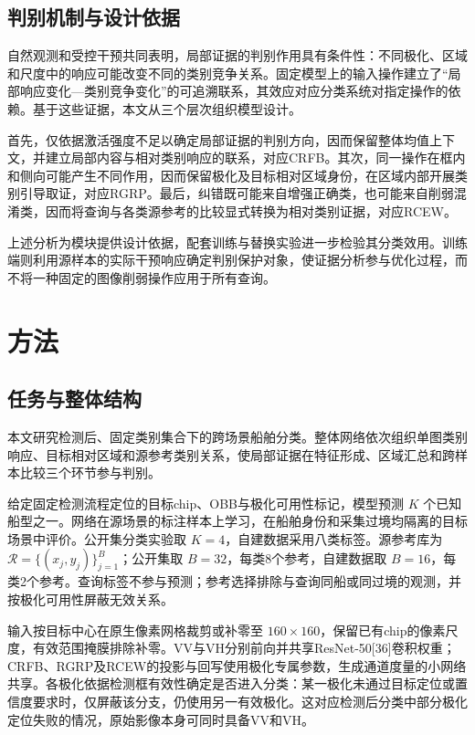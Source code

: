 \documentclass[journal,10pt,a4paper]{IEEEtran}
\begin{document}
\subsection{判别机制与设计依据}\label{ux5224ux522bux673aux5236ux4e0eux8bbeux8ba1ux4f9dux636e}

自然观测和受控干预共同表明，局部证据的判别作用具有条件性：不同极化、区域和尺度中的响应可能改变不同的类别竞争关系。固定模型上的输入操作建立了``局部响应变化---类别竞争变化''的可追溯联系，其效应对应分类系统对指定操作的依赖。基于这些证据，本文从三个层次组织模型设计。

首先，仅依据激活强度不足以确定局部证据的判别方向，因而保留整体均值上下文，并建立局部内容与相对类别响应的联系，对应CRFB。其次，同一操作在框内和侧向可能产生不同作用，因而保留极化及目标相对区域身份，在区域内部开展类别引导取证，对应RGRP。最后，纠错既可能来自增强正确类，也可能来自削弱混淆类，因而将查询与各类源参考的比较显式转换为相对类别证据，对应RCEW。

上述分析为模块提供设计依据，配套训练与替换实验进一步检验其分类效用。训练端则利用源样本的实际干预响应确定判别保护对象，使证据分析参与优化过程，而不将一种固定的图像削弱操作应用于所有查询。

\section{方法}\label{ux65b9ux6cd5}

\subsection{任务与整体结构}\label{ux4efbux52a1ux4e0eux6574ux4f53ux7ed3ux6784}

本文研究检测后、固定类别集合下的跨场景船舶分类。整体网络依次组织单图类别响应、目标相对区域和源参考类别关系，使局部证据在特征形成、区域汇总和跨样本比较三个环节参与判别。

给定固定检测流程定位的目标chip、OBB与极化可用性标记，模型预测 \(K\) 个已知船型之一。网络在源场景的标注样本上学习，在船舶身份和采集过境均隔离的目标场景中评价。公开集分类实验取 \(K=4\)，自建数据采用八类标签。源参考库为 \(\mathcal R=\{(x_j,y_j)\}_{j=1}^{B}\)；公开集取 \(B=32\)，每类8个参考，自建数据取 \(B=16\)，每类2个参考。查询标签不参与预测；参考选择排除与查询同船或同过境的观测，并按极化可用性屏蔽无效关系。

输入按目标中心在原生像素网格裁剪或补零至 \(160\times160\)，保留已有chip的像素尺度，有效范围掩膜排除补零。VV与VH分别前向并共享ResNet-50{[}36{]}卷积权重；CRFB、RGRP及RCEW的投影与回写使用极化专属参数，生成通道度量的小网络共享。各极化依据检测框有效性确定是否进入分类：某一极化未通过目标定位或置信度要求时，仅屏蔽该分支，仍使用另一有效极化。这对应检测后分类中部分极化定位失败的情况，原始影像本身可同时具备VV和VH。
\end{document}
